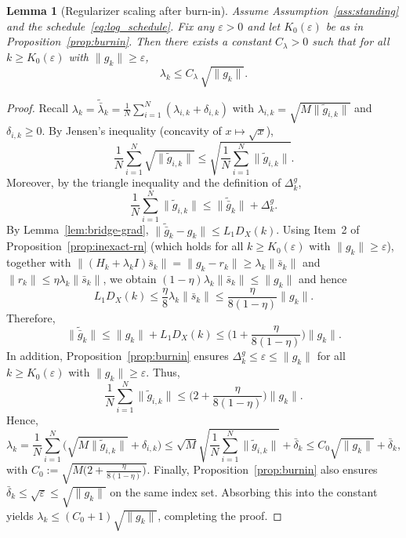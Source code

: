 \documentclass[10pt,twocolumn,letterpaper]{article}
\theoremstyle{compact}
\newtheorem{lemma}[theorem]{Lemma}
\theoremstyle{compactremark}
\begin{document}
\begin{lemma}[Regularizer scaling after burn-in]\label{lem:lambda_scaling}
Assume Assumption~\ref{ass:standing} and the schedule~\eqref{eq:log_schedule}.
Fix any $\varepsilon>0$ and let $K_0(\varepsilon)$ be as in Proposition~\ref{prop:burnin}.
Then there exists a constant $C_\lambda>0$ such that for all $k\ge K_0(\varepsilon)$ with $\|g_k\|\ge \varepsilon$,
\[
\lambda_k\le C_\lambda\,\sqrt{\|g_k\|}.
\]
\end{lemma}
\begin{proof}
Recall $\lambda_k=\tilde{\bar\lambda}_k=\frac1N\sum_{i=1}^N(\lambda_{i,k}+\delta_{i,k})$ with
$\lambda_{i,k}=\sqrt{M\|\tilde g_{i,k}\|}$ and $\delta_{i,k}\ge 0$.
By Jensen's inequality (concavity of $x\mapsto\sqrt{x}$),
\[
\frac1N\sum_{i=1}^N \sqrt{\|\tilde g_{i,k}\|}
\le \sqrt{\frac1N\sum_{i=1}^N \|\tilde g_{i,k}\|}.
\]
Moreover, by the triangle inequality and the definition of $\Delta_k^g$,
\[
\frac1N\sum_{i=1}^N \|\tilde g_{i,k}\|
\le \|\tilde{\bar g}_k\|+\Delta_k^g.
\]
By Lemma~\ref{lem:bridge-grad}, $\|\tilde{\bar g}_k-g_k\|\le L_1D_X(k)$.
Using Item~2 of Proposition~\ref{prop:inexact-rn} (which holds for all $k\ge K_0(\varepsilon)$ with $\|g_k\|\ge \varepsilon$),
together with $\|(H_k+\lambda_k I)\bar s_k\|=\|g_k-r_k\|\ge \lambda_k\|\bar s_k\|$ and $\|r_k\|\le \eta\lambda_k\|\bar s_k\|$,
we obtain $(1-\eta)\lambda_k\|\bar s_k\|\le \|g_k\|$ and hence
\[
L_1D_X(k)\le \frac{\eta}{8}\lambda_k\|\bar s_k\|\le \frac{\eta}{8(1-\eta)}\|g_k\|.
\]
Therefore,
\[
\|\tilde{\bar g}_k\|\le \|g_k\|+L_1D_X(k)\le \Big(1+\frac{\eta}{8(1-\eta)}\Big)\|g_k\|.
\]
In addition, Proposition~\ref{prop:burnin} ensures $\Delta_k^g\le \varepsilon\le \|g_k\|$ for all $k\ge K_0(\varepsilon)$ with $\|g_k\|\ge \varepsilon$.
Thus,
\[
\frac1N\sum_{i=1}^N \|\tilde g_{i,k}\|
\le \Big(2+\frac{\eta}{8(1-\eta)}\Big)\|g_k\|.
\]
Hence,
\[
\lambda_k
= \frac1N\sum_{i=1}^N\big(\sqrt{M\|\tilde g_{i,k}\|}+\delta_{i,k}\big)
\le \sqrt{M}\sqrt{\frac1N\sum_{i=1}^N \|\tilde g_{i,k}\|}+\bar\delta_k
\le C_0\sqrt{\|g_k\|}+\bar\delta_k,
\]
with $C_0:=\sqrt{M\big(2+\frac{\eta}{8(1-\eta)}\big)}$.
Finally, Proposition~\ref{prop:burnin} also ensures $\bar\delta_k\le \sqrt{\varepsilon}\le \sqrt{\|g_k\|}$ on the same index set.
Absorbing this into the constant yields $\lambda_k\le (C_0+1)\sqrt{\|g_k\|}$, completing the proof.
\end{proof}
\end{document}

